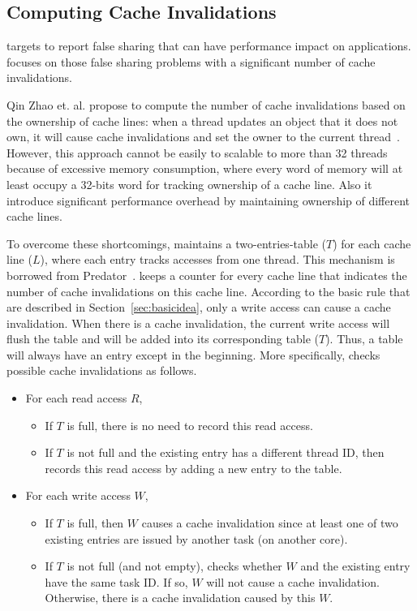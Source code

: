 \subsection{Computing Cache Invalidations}
\label{sec:computeinvalidations}

\Cheetah{} targets to report false sharing that can have performance impact on applications. \Cheetah{} focuses on those false sharing problems with a significant number of cache invalidations.  

Qin Zhao et. al. propose to compute the number of cache invalidations based on the ownership of cache lines: when a thread updates an object that it does not own, it will cause cache invalidations and set the owner to the current thread~\cite{qinzhao}. However, this approach cannot be easily to scalable to more than 32 threads because of excessive memory consumption, where every word of memory will at least occupy a 32-bits word for tracking ownership of a cache line. Also it introduce significant performance overhead by maintaining ownership of different cache lines. 

To overcome these shortcomings, \Cheetah{} maintains a two-entries-table ($T$) for each cache line ($L$), where each entry tracks accesses from one thread. This mechanism is borrowed from Predator~\cite{Predator}. \Cheetah{} keeps a counter for every cache line that indicates the number of cache invalidations on this cache line.  
According to the basic rule that are described in Section~\ref{sec:basicidea}, only a write access can cause a cache invalidation. When there is a cache invalidation, the current write access will flush the table and will be added into its corresponding table ($T$). Thus, a table will always have an entry except in the beginning. More specifically, \cheetah{} checks possible cache invalidations as follows.
 
\begin{itemize}
\item
  For each read access $R$,
  \begin{itemize}
    \item
      If $T$ is full, there is no need to record this read access.
    \item
      If $T$ is not full and the existing entry has a different thread ID, 
      then \cheetah{} records this read access by adding a new entry to the table.
  \end{itemize}
\item
  For each write access $W$,  
  \begin{itemize}
    \item
      If $T$ is full, then $W$ causes a cache invalidation since at least one of two existing entries are issued by another task (on another core).
    \item
      If $T$ is not full (and not empty),
      \cheetah{} checks whether $W$ and the existing entry have the same task ID. If
      so, $W$ will not cause a cache invalidation. Otherwise, there is a cache invalidation caused by this $W$.
  \end{itemize}
\end{itemize}

